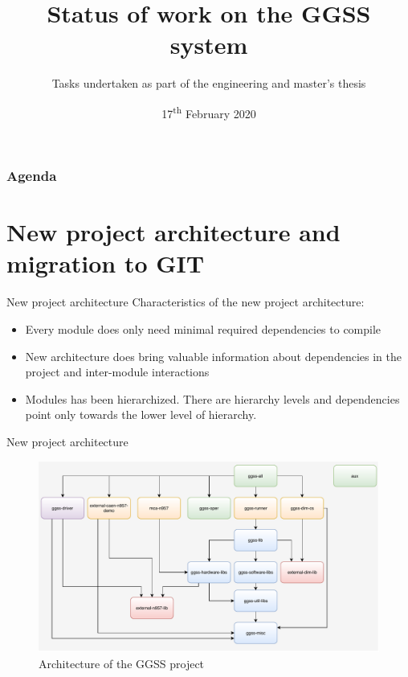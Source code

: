 \documentclass[10pt]{beamer}
\title{Status of work on the GGSS system}
\subtitle{\normalsize{Tasks undertaken as part of the engineering and master's thesis}}
\date{17\textsuperscript{th} February 2020}
\author{\normalsize{Arkadiusz Kasprzak \newline \and Jarosław Cierpich \newline \and Grzegorz Podsiadło \newline \newline \and Supervisor: Bartosz Mindur}}
\begin{document}
\maketitle

\begin{frame}
\frametitle{Agenda}
\tableofcontents
\end{frame}

\section {New project architecture and migration to GIT}

\begin{frame}{New project architecture}
Characteristics of the new project architecture:
\begin{itemize}
	\item Every module does only need minimal required dependencies to compile
	\item New architecture does bring valuable information about dependencies in the project and inter-module interactions
	\item Modules has been hierarchized. There are hierarchy levels and dependencies point only towards the lower level of hierarchy.
\end{itemize}
\end{frame}

\begin{frame}{New project architecture}
\begin{figure}
\centering
\includegraphics[width=\linewidth]{resources/topLevelArchitecture}
\caption{Architecture of the GGSS project}
\end{figure}
\end{frame}
\end{document}

